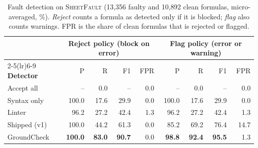 \begin{table}[!t]
\caption{Fault detection on \textsc{SheetFault} (13{,}356 faulty and 10{,}892 clean formulas, micro-averaged, \%). \emph{Reject} counts a formula as detected only if it is blocked; \emph{flag} also counts warnings. FPR is the share of clean formulas that is rejected or flagged.}
\label{tab:e1-overall}

\centering\footnotesize
\begin{tabular}{l rrrr rrrr}
\toprule
& \multicolumn{4}{c}{\textbf{Reject policy} (block on error)} & \multicolumn{4}{c}{\textbf{Flag policy} (error or warning)} \\
\cmidrule(lr){2-5}\cmidrule(lr){6-9}
\textbf{Detector} & P & R & F1 & FPR & P & R & F1 & FPR \\
\midrule
Accept all & -- & 0.0 & -- & 0.0 & -- & 0.0 & -- & 0.0 \\
Syntax only & 100.0 & 17.6 & 29.9 & 0.0 & 100.0 & 17.6 & 29.9 & 0.0 \\
Linter & 96.2 & 27.2 & 42.4 & 1.3 & 96.2 & 27.2 & 42.4 & 1.3 \\
Shipped (v1) & 100.0 & 44.2 & 61.3 & 0.0 & 85.2 & 69.2 & 76.4 & 14.7 \\
GroundCheck & \textbf{100.0} & \textbf{83.0} & \textbf{90.7} & 0.0 & \textbf{98.8} & \textbf{92.4} & \textbf{95.5} & 1.3 \\
\bottomrule
\end{tabular}
\end{table}
